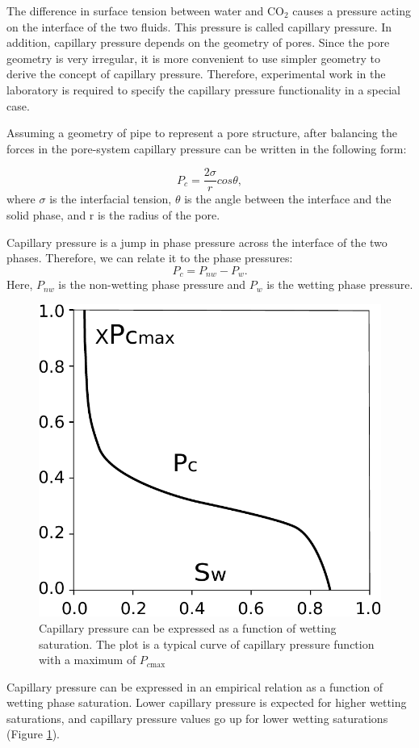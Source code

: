 The difference in surface tension between water and $\mbox{CO}_2$ causes a
pressure acting on the interface of the two fluids. This pressure is called
capillary pressure. In addition, capillary pressure depends on the geometry of
pores. Since the pore geometry is very irregular, it is more convenient to use
simpler geometry to derive the concept of capillary pressure. Therefore,
experimental work in the laboratory is required to specify the capillary
pressure functionality in a special case. 

Assuming a geometry of pipe to represent a pore structure, after balancing the
forces in the pore-system capillary pressure can be written in the following
form:

\begin{equation}
 P_c=\frac{2\sigma}{r}cos\theta,
 \label{eq:pcS}
\end{equation} where $\sigma$ is the interfacial tension, $\theta$ is the angle
between the interface and the solid phase, and r is the radius of the pore.

Capillary pressure is a jump in phase pressure across the interface of the two
phases. Therefore, we can relate it to the phase pressures:
\begin{equation}
 P_c=P_{nw}-P_w.
 \label{eq:pcJump}
\end{equation} Here, $P_{nw}$ is the non-wetting phase pressure and $P_w$ is the
wetting phase pressure. 


\begin{figure} 
  \centering{}
  \includegraphics[width= 0.45 \linewidth]{./figurer/Pc}
  \caption{Capillary pressure can be expressed as a function of wetting
saturation. The plot is a typical curve of capillary pressure function with a
maximum of $P_{c\mbox{max}}$}
  \label{fig:pc}
\end{figure}

Capillary pressure can be expressed in an empirical relation as a function of
wetting phase saturation. Lower capillary pressure is expected for higher
wetting saturations, and capillary pressure values go up for lower wetting
saturations (Figure \ref{fig:pc}). 

